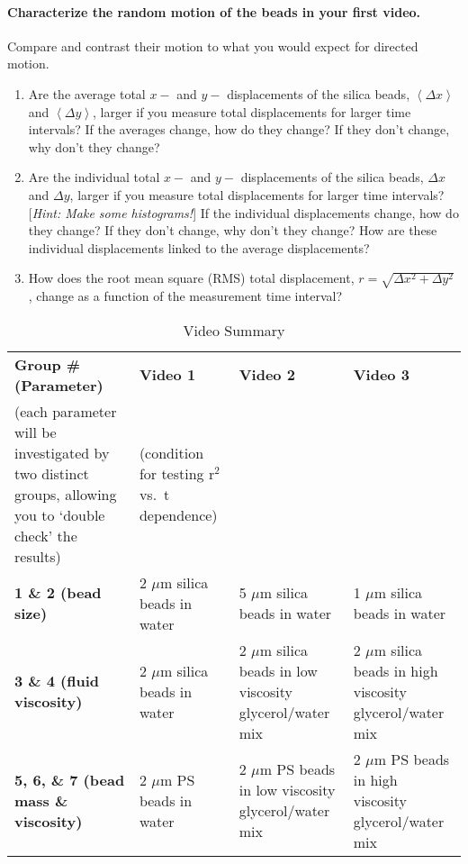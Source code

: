 \paragraph*{Characterize the random motion of the beads in your first video.} Compare and contrast their motion to what you would expect for directed motion.
\begin{enumerate}
\item Are the average total $x-$ and $y-$ displacements of the silica beads, $\left \langle \Delta x \right \rangle$ and $\left \langle \Delta y \right \rangle$, larger if you measure total displacements for larger time intervals? If the averages change, how do they change? If they don't change, why don't they change?
\item Are the individual total $x-$ and $y-$ displacements of the silica beads, $\Delta x$ and $\Delta y$, larger if you measure total displacements for larger time intervals? [\textit{Hint: Make some histograms!}] If the individual displacements change, how do they change? If they don't change, why don't they change? How are these individual displacements linked to the average displacements?
\item How does the root mean square (RMS) total displacement, $r=\sqrt{\Delta x^2+\Delta y^2}$ , change as a function of the measurement time interval?
\end{enumerate}

\begin{table}[ht]
\centering
\caption{Video Summary}
\label{tab:exp3video}
\begin{tabular}{|p{4.5cm}|p{3cm}|p{3cm}|p{3cm}|}
\hline
 \textbf{Group \# (Parameter)} & \textbf{Video 1} & \textbf{Video 2} & \textbf{Video 3}  \\
 (each parameter will be investigated by two distinct groups, allowing you to `double check' the results) & (condition for testing r$^2$ vs.\ t dependence) &  & \\ \hline
 \textbf{1 \& 2 (bead size)} & 2 $\mu$m silica beads in water & 5 $\mu$m silica beads in water & 1 $\mu$m silica beads in water \\ \hline
 \textbf{3 \& 4 (fluid viscosity)} & 2 $\mu$m silica beads in water & 2 $\mu$m silica beads in low viscosity glycerol/water mix & 2 $\mu$m silica beads in high viscosity glycerol/water mix \\ \hline
 \textbf{5, 6, \& 7 (bead mass \& viscosity)} & 2 $\mu$m PS beads in water & 2 $\mu$m PS beads in low viscosity glycerol/water mix & 2 $\mu$m PS beads in high viscosity glycerol/water mix \\ \hline
\end{tabular}
\end{table}

